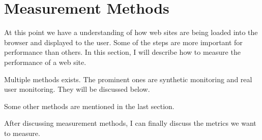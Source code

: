 









\section{Measurement Methods}



At this point we have a understanding of how web sites are being loaded into the browser and displayed to the user.
Some of the steps are more important for performance than others.
In this section, I will describe how to measure the performance of a web site.


Multiple methods exists.
The prominent ones are synthetic monitoring and real user monitoring.
They will be discussed below.

Some other methods are mentioned in the last section.

After discussing measurement methods, I can finally discuss the metrics we want to measure.










